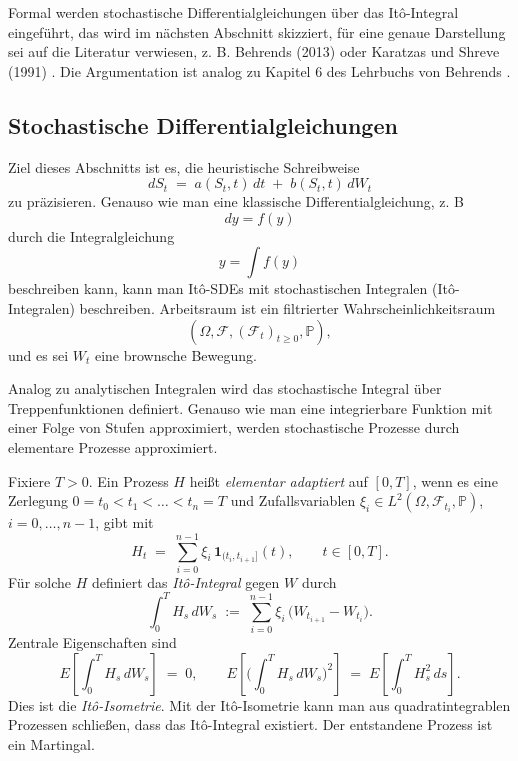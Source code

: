 Formal werden stochastische Differentialgleichungen über das It\^o-Integral eingeführt, das wird 
im nächsten Abschnitt skizziert, für eine genaue Darstellung sei auf die Literatur 
verwiesen, z. B. Behrends (2013) \cite{behrends} oder Karatzas und Shreve (1991) \cite{karatzas_brownian_1991}.
Die Argumentation ist analog zu Kapitel 6 des Lehrbuchs von Behrends \cite{behrends}.

\subsection{Stochastische Differentialgleichungen}
Ziel dieses Abschnitts ist es, die heuristische Schreibweise
$$
dS_t \;=\; a(S_t,t)\,dt \;+\; b(S_t,t)\,dW_t
$$
zu präzisieren. Genauso wie man eine klassische Differentialgleichung, z. B
$$dy = f(y)$$
durch die Integralgleichung
$$y = \int f(y)$$
beschreiben kann, kann man It\^o-SDEs mit stochastischen Integralen (It\^o-Integralen) beschreiben.
Arbeitsraum ist ein filtrierter Wahrscheinlichkeitsraum
$$
(\Omega,\mathcal F,(\mathcal F_t)_{t\ge 0},\mathbb P),
$$
und es sei $W_t$ eine brownsche Bewegung. 

Analog zu analytischen Integralen
wird das stochastische Integral über Treppenfunktionen definiert. 
Genauso wie man eine integrierbare Funktion mit einer Folge von Stufen approximiert, werden
stochastische Prozesse durch elementare Prozesse approximiert.

\begin{defi}
Fixiere $T>0$. Ein Prozess $H$ heißt \emph{elementar adaptiert} auf $[0,T]$, wenn es eine 
Zerlegung $0=t_0<t_1<\dots<t_n=T$ und Zufallsvariablen $\xi_i\in L^2(\Omega,\mathcal F_{t_i},\mathbb P)$, $i=0,\dots,n-1$, gibt mit
$$
H_t \;=\; \sum_{i=0}^{n-1} \xi_i\,\mathbf 1_{(t_i,t_{i+1}]}(t),\qquad t\in[0,T].
$$
Für solche $H$ definiert das \emph{It\^o-Integral} gegen $W$ durch
$$
\int_0^T H_s\,dW_s \;:=\; \sum_{i=0}^{n-1} \xi_i\,\big(W_{t_{i+1}}-W_{t_i}\big).
$$
Zentrale Eigenschaften sind
$$
E\!\left[\int_0^T H_s\,dW_s\right] \;=\; 0,\qquad
E\!\left[\Big(\int_0^T H_s\,dW_s\Big)^{\!2}\right] \;=\; E\!\left[\int_0^T H_s^2\,ds\right].
$$
Dies ist die \emph{It\^o-Isometrie}. Mit der It\^o-Isometrie kann man aus quadratintegrablen Prozessen
schließen, dass das It\^o-Integral existiert. Der entstandene Prozess ist ein Martingal.
\end{defi}

